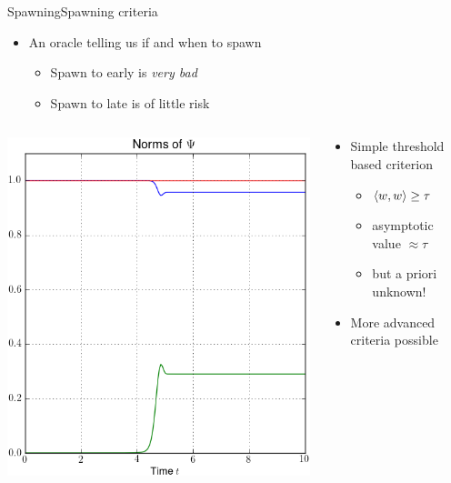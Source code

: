 \documentclass{beamer}
\begin{document}
\begin{frame}{Spawning}{Spawning criteria}
  \begin{itemize}
    \item An oracle telling us if and when to spawn
    \begin{itemize}
      \item Spawn to early is \emph{very bad}
      \item Spawn to late is of little risk
    \end{itemize}
  \end{itemize}
  \begin{columns}
    \begin{column}[T]{0.4\textwidth}
      \begin{center}
        \includegraphics[scale=0.3]{./fig/norms_block0.png}
      \end{center}
    \end{column}
    \begin{column}[T]{0.6\textwidth}
      \begin{itemize}
        \item Simple threshold based criterion
        \begin{itemize}
          \item $\Braket{w,w} \geq \tau$
          \item asymptotic value $\approx \tau$
          \item but a priori unknown!
        \end{itemize}
        \item More advanced criteria possible
      \end{itemize}      
    \end{column}
  \end{columns}
\end{frame}
\end{document}
